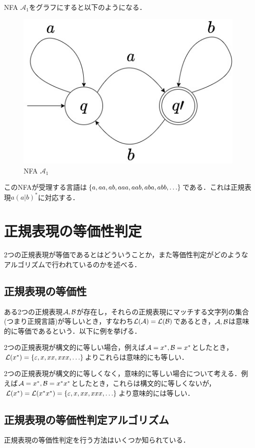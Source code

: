 \documentclass[a4paper, 12pt, dvipdfmx, uplatex]{jsreport}
\begin{document}
NFA $\mathcal{A}_1$をグラフにすると以下のようになる．
\begin{figure}[H] %
  \centering
  \includegraphics[width=0.5\linewidth]{../figures/nfa.jpg}
  \caption{NFA $\mathcal{A}_1$\label{nfa_example}}
\end{figure}

このNFAが受理する言語は$\qty{a,aa,ab,aaa,aab,aba,abb,\ldots}$である．これは正規表現$a(a|b)^*$に対応する．


\section{正規表現の等価性判定}
2つの正規表現が等価であるとはどういうことか，また等価性判定がどのようなアルゴリズムで行われているのかを述べる．

\subsection{正規表現の等価性}
ある2つの正規表現$\mathcal{A},\mathcal{B}$が存在し，それらの正規表現にマッチする文字列の集合(つまり正規言語)が等しいとき，すなわち$\mathcal{L(A)}=\mathcal{L(B)}$であるとき，$\mathcal{A},\mathcal{B}$は意味的に等価であるという．以下に例を挙げる．

2つの正規表現が構文的に等しい場合，例えば$\mathcal{A}=x^*,\mathcal{B}=x^*$としたとき，$\mathcal{L}(x^*)=\qty{\varepsilon,x,xx,xxx,\ldots}$よりこれらは意味的にも等しい．

2つの正規表現が構文的に等しくなく，意味的に等しい場合について考える．例えば$\mathcal{A}=x^*,\mathcal{B}=x^*x^*$としたとき，これらは構文的に等しくないが，$\mathcal{L}(x^*)=\mathcal{L}(x^*x^*)=\qty{\varepsilon,x,xx,xxx,\ldots}$より意味的には等しい．

\subsection{正規表現の等価性判定アルゴリズム}
正規表現の等価性判定を行う方法はいくつか知られている．
\end{document}
